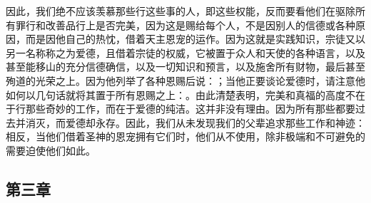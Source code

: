 因此，我们绝不应该羡慕那些行这些事的人，即这些权能，反而要看他们在驱除所有罪行和改善品行上是否完美，因为这是赐给每个人，不是因别人的信德或各种原因，而是因他自己的热忱，借着天主恩宠的运作。因为这就是实践知识，宗徒又以另一名称称之为爱德，且借着宗徒的权威，它被置于众人和天使的各种语言，以及甚至能移山的充分信德确信，以及一切知识和预言，以及施舍所有财物，最后甚至殉道的光荣之上。因为他列举了各种恩赐后说：；当他正要谈论爱德时，请注意他如何以几句话就将其置于所有恩赐之上：。由此清楚表明，完美和真福的高度不在于行那些奇妙的工作，而在于爱德的纯洁。这并非没有理由。因为所有那些都要过去并消灭，而爱德却永存。因此，我们从未发现我们的父辈追求那些工作和神迹：相反，当他们借着圣神的恩宠拥有它们时，他们从不使用，除非极端和不可避免的需要迫使他们如此。\par


\subsection{第三章}

\par

